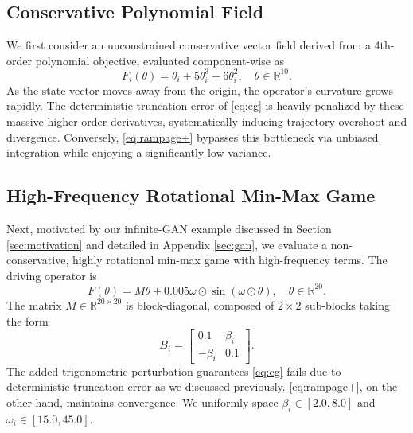 \documentclass[letter,11pt]{article}
\begin{document}
\subsection{Conservative Polynomial Field}\label{sec:exp-1}
We first consider an unconstrained conservative vector field derived from a 4th-order polynomial objective, evaluated component-wise as
\begin{equation}
F_i(\theta) = \theta_i + 5\theta_i^3 - 6\theta_i^2, \quad\theta \in \mathbb{R}^{10}.
\end{equation}
As the state vector moves away from the origin, the operator's curvature grows rapidly. The deterministic truncation error of \eqref{eq:eg} is heavily penalized by these massive higher-order derivatives, systematically inducing trajectory overshoot and divergence. Conversely,  \eqref{eq:rampage+} bypasses this bottleneck via unbiased integration while enjoying a significantly low variance.

\subsection{High-Frequency Rotational Min-Max Game}\label{sec:exp-2}
Next, motivated by our infinite-GAN example discussed in Section \ref{sec:motivation} and detailed in Appendix \ref{sec:gan}, we evaluate a non-conservative, highly rotational min-max game with high-frequency terms. The driving operator is 
\begin{equation}
F(\theta) = M\theta + 0.005\omega \odot \sin(\omega \odot \theta), \quad\theta \in \mathbb{R}^{20}.
\end{equation}
The matrix $M \in \mathbb{R}^{20 \times 20}$ is block-diagonal, composed of $2 \times 2$ sub-blocks taking the form
\begin{equation}
B_i = \begin{bmatrix} 0.1 & \beta_i \\ -\beta_i & 0.1 \end{bmatrix}.
\end{equation}
The added trigonometric perturbation guarantees \eqref{eq:eg} fails due to deterministic truncation error as we discussed previously. \eqref{eq:rampage+}, on the other hand, maintains convergence. We uniformly space $\beta_i \in [2.0, 8.0]$ and $\omega_i \in [15.0, 45.0]$.
\end{document}
